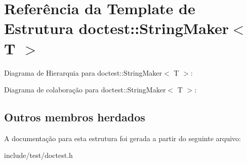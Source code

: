 \hypertarget{structdoctest_1_1StringMaker}{}\section{Referência da Template de Estrutura doctest\+:\+:String\+Maker$<$ T $>$}
\label{structdoctest_1_1StringMaker}


Diagrama de Hierarquia para doctest\+:\+:String\+Maker$<$ T $>$\+:


Diagrama de colaboração para doctest\+:\+:String\+Maker$<$ T $>$\+:
\subsection*{Outros membros herdados}


A documentação para esta estrutura foi gerada a partir do seguinte arquivo\+:\begin{DoxyCompactItemize}
\item 
include/test/doctest.\+h\end{DoxyCompactItemize}
